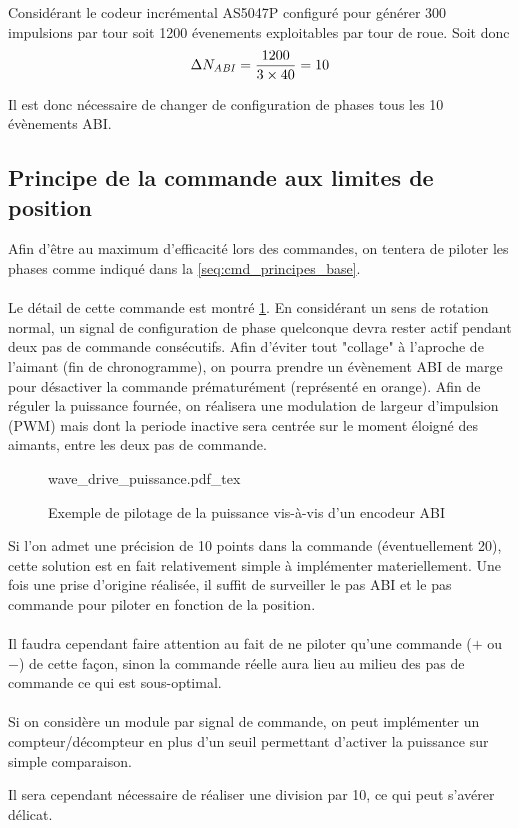 Considérant le codeur incrémental AS5047P configuré pour générer 300 impulsions par tour soit 1200 évenements exploitables par tour de roue.
Soit donc 
$$\Delta N_\mathit{ABI} = \frac{1200}{3\times40} = 10$$

Il est donc nécessaire de changer de configuration de phases tous les 10 évènements ABI.

\subsection{Principe de la commande aux limites de position}
Afin d'être au maximum d'efficacité lors des commandes, on tentera de piloter les phases comme indiqué dans la \cref{seq:cmd_principes_base}.

\paragraph{}
Le détail de cette commande est montré \cref{fig:wave_drive_wrt_abi}. 
En considérant un sens de rotation normal, un signal de configuration de phase quelconque devra rester actif pendant deux pas de commande consécutifs.
Afin d'éviter tout "collage" à l'aproche de l'aimant (fin de chronogramme), on pourra prendre un évènement ABI de marge pour désactiver la commande prématurément (représenté en orange).
Afin de réguler la puissance fournée, on réalisera une modulation de largeur d'impulsion (PWM) mais dont la periode inactive sera centrée sur le moment éloigné des aimants, entre les deux pas de commande.

\begin{figure}[h]
    \centering
    \def\svgwidth{17cm}
    \small
    {wave_drive_puissance.pdf_tex}
    \caption{Exemple de pilotage de la puissance vis-à-vis d'un encodeur ABI}
    \label{fig:wave_drive_wrt_abi}
\end{figure}

Si l'on admet une précision de 10 points dans la commande (éventuellement 20), cette solution est en fait relativement simple à implémenter materiellement.
Une fois une prise d'origine réalisée, il suffit de surveiller le pas ABI et le pas commande pour piloter en fonction de la position.

\paragraph{}
Il faudra cependant faire attention au fait de ne piloter qu'une commande ($+$ ou $-$) de cette façon, sinon la commande réelle aura lieu au milieu des pas de commande ce qui est sous-optimal.

\paragraph{}
Si on considère un module par signal de commande, on peut implémenter un compteur/décompteur en plus d'un seuil permettant d'activer la puissance sur simple comparaison.

Il sera cependant nécessaire de réaliser une division par 10, ce qui peut s'avérer délicat.
